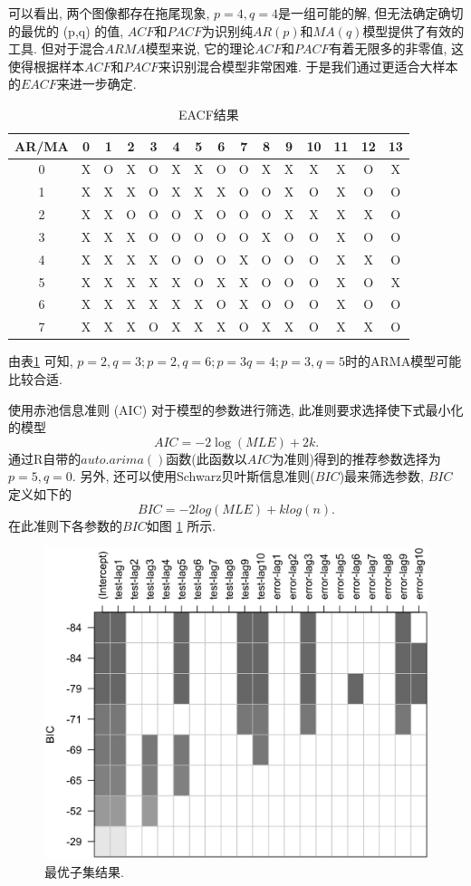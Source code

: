 \documentclass[11pt]{article}
\begin{document}
\qquad 可以看出, 两个图像都存在拖尾现象, $p=4,q=4$是一组可能的解, 但无法确定确切的最优的 (p,q) 的值, $ACF$和$PACF$为识别纯$AR(p)$和$MA(q)$模型提供了有效的工具. 但对于混合$ARMA$模型来说, 它的理论$ACF$和$PACF$有着无限多的非零值, 这使得根据样本$ACF$和$PACF$来识别混合模型非常困难. 于是我们通过更适合大样本的$EACF$来进一步确定.
\begin{longtable}[c]{c|cccccccccccccc}
    \caption{EACF结果}
    \label{tab:my-table}\\
    \hline
    AR/MA & 0 & 1 & 2 & 3 & 4 & 5 & 6 & 7 & 8 & 9 & 10 & 11 & 12 & 13 \\ \hline
    \endfirsthead
    \endhead
    \hline
    \endfoot
    \endlastfoot
    0     & X & O & X & O & X & X & O & O & X & X & X  & X  & O  & X  \\
    1     & X & X & X & O & X & X & X & O & O & X & O  & X  & O  & O  \\
    2     & X & X & O & O & O & X & O & O & O & X & X  & X  & X  & O  \\
    3     & X & X & X & O & O & O & O & O & X & O & O  & X  & O  & O  \\
    4     & X & X & X & X & O & O & O & X & O & O & O  & X  & X  & O  \\
    5     & X & X & X & X & X & O & X & X & O & O & O  & X  & O  & X  \\
    6     & X & X & X & X & X & X & O & X & O & O & O  & X  & O  & O  \\
    7     & X & X & X & O & X & X & X & O & X & X & O  & X  & X  & O  \\ \hline
    \end{longtable}
由表\ref{tab:my-table} 可知, $p=2,q=3;p=2,q=6;p=3 q=4;p=3,q=5$时的ARMA模型可能比较合适. 

\qquad 使用赤池信息准则 (AIC) 对于模型的参数进行筛选, 此准则要求选择使下式最小化的模型\[
    AIC=-2\log(MLE) +2k.
\]
通过R自带的$auto.arima()$函数(此函数以$AIC$为准则)得到的推荐参数选择为$p=5,q=0$. 另外, 还可以使用Schwarz贝叶斯信息准则($BIC$)最来筛选参数, $BIC$定义如下的\[
    BIC= -2log(MLE)+klog(n).
\]
在此准则下各参数的$BIC$如图 \ref{fig:bic} 所示.
\begin{figure}
    \centering
    \includegraphics[width=.4\textwidth]{bic}
    \caption{最优子集结果. \label{fig:bic}}
\end{figure}
\end{document}
